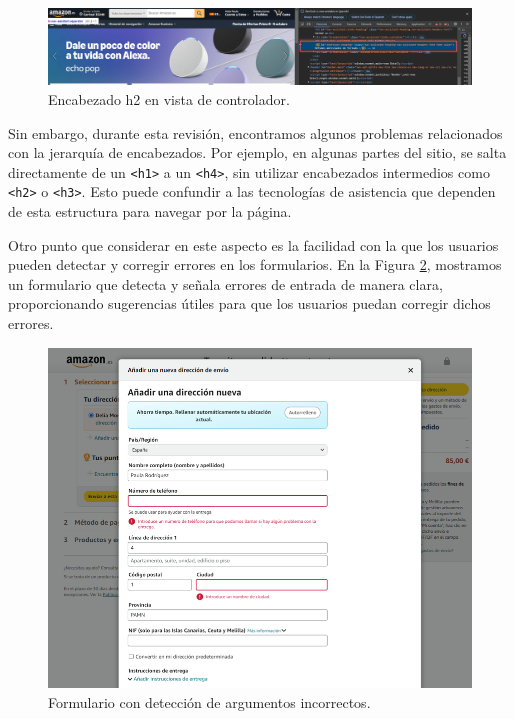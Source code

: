 \documentclass[letterpaper, 12pt]{report}
\begin{document}
\begin{figure}[H]
\centering
\includegraphics[width=1\textwidth]{figure15.png}
\caption{Encabezado h2 en vista de controlador.}
\label{fig:15}
\end{figure}

Sin embargo, durante esta revisión, encontramos algunos problemas relacionados con la jerarquía de encabezados. Por ejemplo, en algunas partes del sitio, se salta directamente de un \texttt{<h1>} a un \texttt{<h4>}, sin utilizar encabezados intermedios como \texttt{<h2>} o \texttt{<h3>}. Esto puede confundir a las tecnologías de asistencia que dependen de esta estructura para navegar por la página.

Otro punto que considerar en este aspecto es la facilidad con la que los usuarios pueden detectar y corregir errores en los formularios. En la Figura \ref{fig:16}, mostramos un formulario que detecta y señala errores de entrada de manera clara, proporcionando sugerencias útiles para que los usuarios puedan corregir dichos errores.

\begin{figure}[H]
\centering
\includegraphics[width=1\textwidth]{figure16.png}
\caption{Formulario con detección de argumentos incorrectos.}
\label{fig:16}
\end{figure}
\end{document}

